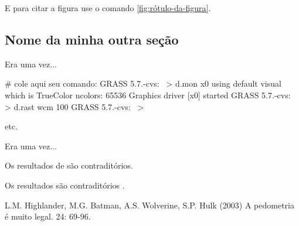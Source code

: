 E para citar a figura use o comando \ref{fig:rótulo-da-figura}.



\subsection{Nome da minha outra seção}
\label{sec:rótulo-da-minha-outra-seção}



Era uma vez...



\begin{smallverbatim}
# cole aqui seu comando:
GRASS 5.7.-cvs:~ > d.mon x0
using default visual which is TrueColor
ncolors: 65536
Graphics driver [x0] started
GRASS 5.7.-cvs:~ > d.rast wcm
 100%
GRASS 5.7.-cvs:~ >

etc. 
\end{smallverbatim}



Era uma vez...



Os resultados de \cite{highlander:2003} são contraditórios.



Os resultados são contraditórios \citep{highlander:2003}.



\begin{footnotesize}
\begin{thebibliography}{99}



L.M. Highlander, M.G. Batman, A.S. Wolverine, S.P. Hulk (2003)
\newblock A pedometria é muito legal.
 24: 69-96.





\end{thebibliography}
\end{footnotesize}



\address{Seu Nome\\
  Sua Organização\\
  \url{seu website}\\
  }



